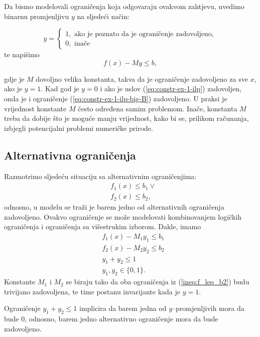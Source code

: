 \documentclass[a4paper, utf8, 11pt, colorlinks]{book}
\theoremstyle{definition}
\begin{document}
 Da bismo modelovali ograničenja koja odgovaraju ovakvom zahtjevu, uvedimo binarnu promjenljivu $y$ na sljedeći način:
 
$$y =\begin{cases}
1, \mbox{ ako je poznato da je ograničenje zadovoljeno}, \\
0, \mbox{ inače}
\end{cases}$$
te napišimo 
\begin{equation}\label{eq:constr-ex-1-ilp-big-B}
   f(x) - M y \leq b,
\end{equation}

gdje je $M$ dovoljno velika konstanta, takva da je 
ograničenje zadovoljeno za sve $x$, ako je $y =1$. Kad god je $y=0$ i ako je uslov (\ref{eq:constr-ex-1-ilp}) zadovoljen, onda je i ograničenje (\ref{eq:constr-ex-1-ilp-big-B}) zadovoljeno. U praksi je vrijednost  konstante $M$ često određena samim problemom. Inače, konstanta $M$ treba da dobije što je moguće manju vrijednost, kako bi se, prilikom računanja, izbjegli potencijalni problemi numeričke prirode. 



\subsection{Alternativna ograničenja} 

Razmotrimo sljedeću situaciju sa alternativnim ograničenjima:
\begin{align}
     &f_1(x) \leq b_1 \vee \nonumber\\
     &f_2(x) \leq b_2,\label{ineq:f_leq_b2}
\end{align}
odnosno, u modelu se traži je barem jedno od alternativnih ograničenja zadovoljeno. 
Ovakvo ograničenje se može modelovati kombinovanjem logičkih ograničenja i ograničenja sa višestrukim izborom. Dakle, imamo 
\begin{align*}
      &f_1(x) - M_1 y_1  \leq b_1 \\
      &f_2(x) - M_2 y_2  \leq b_2 \\
      & y_1 + y_2 \leq 1 \\
      & y_1, y_2 \in \{0, 1\}.
\end{align*}
Konstante $M_1$ i $M_2$ se biraju tako da oba ograničenja iz (\ref{ineq:f_leq_b2})  budu trivijano zadovoljena, te time postanu invarijante kada je $y=1$.

Ograničenje $y_1 + y_2 \leq 1$ implicira da barem jedna od $y$--promjenljivih mora da bude 0, odnosno, barem jedno alternativno ograničenje mora da bude zadovoljeno. 
\end{document}
